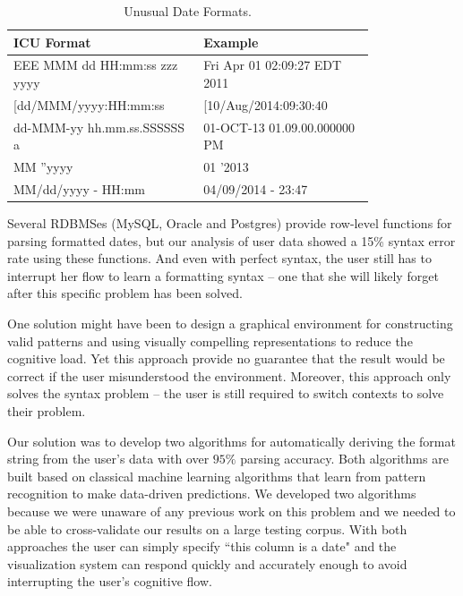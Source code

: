 \begin{table}[ht]
\centering
\bgroup
\def\arraystretch{1.5}
\begin{tabular}{|p{0.4\linewidth}| p{0.4\linewidth}|}
\hline
\centering
\textbf{ICU Format} & \textbf{Example}\\ \hline
\scriptsize{EEE MMM dd HH:mm:ss zzz yyyy} & \scriptsize{Fri Apr 01 02:09:27 EDT 2011}\\ \hline
\scriptsize{[dd/MMM/yyyy:HH:mm:ss} & \scriptsize{[10/Aug/2014:09:30:40}\\ \hline
\scriptsize{dd-MMM-yy hh.mm.ss.SSSSSS a} & \scriptsize{01-OCT-13 01.09.00.000000 PM}\\ \hline
\scriptsize{MM ''yyyy} & \scriptsize{01 '2013}\\ \hline
\scriptsize{MM/dd/yyyy - HH:mm} & \scriptsize{04/09/2014 - 23:47}\\ \hline
\end{tabular}
\egroup
\caption{Unusual Date Formats.}
\label{tab:dateformats}
\end{table}

Several RDBMSes (\eg MySQL, Oracle and Postgres) provide row-level functions for parsing formatted dates, but our analysis of user data showed a 15\% syntax error rate using these functions. And even with perfect syntax, the user still has to interrupt her flow to learn a formatting syntax -- one that she will likely forget after this specific problem has been solved.

One solution might have been to design a graphical environment for constructing valid patterns and using visually compelling representations to reduce the cognitive load. 
Yet this approach provide no guarantee that the result would be correct if the user misunderstood the environment. 
Moreover, this approach only solves the syntax problem -- the user is still required to switch contexts to solve their problem.

Our solution was to develop two algorithms for automatically deriving the format string from the user's data with over $95\%$ parsing accuracy. Both algorithms are built based on classical machine learning algorithms that learn from pattern recognition to make data-driven predictions. We developed two algorithms because we were unaware of any previous work on this problem and we needed to be able to cross-validate our results on a large testing corpus. With both approaches the user can simply specify ``this column is a date" and the visualization system can respond quickly and accurately enough to avoid interrupting the user's cognitive flow.

